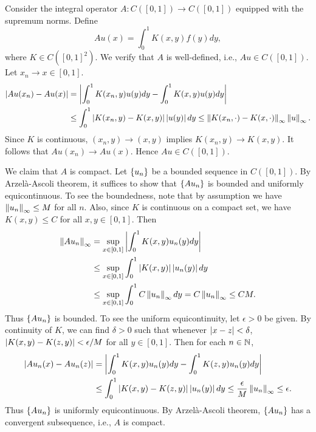 \begin{example}
    Consider the integral operator $A:C([0,1])\to C([0,1])$ equipped with the 
    supremum norms. Define 
    \begin{equation*}
        Au(x) = \int_0^1 K(x,y)f(y)dy,
    \end{equation*}
    where $K\in C([0,1]^2)$. We verify that $A$ is well-defined, i.e., 
    $Au\in C([0,1])$. Let $x_n\to x\in [0,1]$. 
    \begin{equation*}
        \begin{split}
            \left\lvert {Au(x_n) - Au(x)} \right\rvert &= \left\lvert {\int_0^1 K(x_n,y)u(y)dy - \int_0^1 K(x,y)u(y)dy} \right\rvert \\
            &\leq \int_0^1 \left\lvert {K(x_n,y) - K(x,y)} \right\rvert\left\lvert {u(y)} \right\rvert dy 
            \leq \left\lVert {K(x_n,\cdot) - K(x,\cdot)} \right\rVert_\infty\left\lVert {u} \right\rVert_\infty.
        \end{split}
    \end{equation*}
    Since $K$ is continuous, $(x_n,y)\to (x,y)$ implies $K(x_n,y)\to K(x,y)$. 
    It follows that $Au(x_n)\to Au(x)$. Hence $Au\in C([0,1])$.

    We claim that $A$ is compact. Let $\left\{ {u_n} \right\}$ be 
    a bounded sequence in $C([0,1])$. By Arzel\`a-Ascoli theorem, it suffices 
    to show that $\left\{ {Au_n} \right\}$ is bounded and uniformly equicontinuous. To see 
    the boundedness, note that by assumption we have $\left\lVert {u_n} \right\rVert_\infty\leq M$ 
    for all $n$. Also, since $K$ is continuous on a compact set, we have 
    $K(x,y)\leq C$ for all $x,y\in [0,1]$. Then 
    \begin{equation*}
        \begin{split}
            \left\lVert {Au_n} \right\rVert_\infty &= \sup_{x\in [0,1]}\left\lvert {\int_0^1 K(x,y)u_n(y)dy} \right\rvert \\
            &\leq \sup_{x\in [0,1]}\int_0^1 \left\lvert {K(x,y)} \right\rvert\left\lvert {u_n(y)} \right\rvert dy \\
            &\leq \sup_{x\in [0,1]}\int_0^1 C\left\lVert {u_n} \right\rVert_\infty dy = C\left\lVert {u_n} \right\rVert_\infty \leq CM.
        \end{split}
    \end{equation*} 
    Thus $\left\{ {Au_n} \right\}$ is bounded. To see the uniform equicontinuity, let 
    $\epsilon>0$ be given. By continuity of $K$, we can find $\delta>0$ such that 
    whenever $\left\lvert {x-z} \right\rvert<\delta$, $\left\lvert {K(x,y) - K(z,y)} \right\rvert<\epsilon/M$ for all $y\in [0,1]$. 
    Then for each $n\in\mathbb{N}$, 
    \begin{equation*}
        \begin{split}
            \left\lvert {Au_n(x) - Au_n(z)} \right\rvert &= \left\lvert {\int_0^1 K(x,y)u_n(y)dy - \int_0^1 K(z,y)u_n(y)dy} \right\rvert \\
            &\leq \int_0^1 \left\lvert {K(x,y) - K(z,y)} \right\rvert\left\lvert {u_n(y)} \right\rvert dy 
            \leq \frac{\epsilon}{M}\left\lVert {u_n} \right\rVert_\infty \leq \epsilon.
        \end{split}
    \end{equation*}
    Thus $\left\{ {Au_n} \right\}$ is uniformly equicontinuous. By Arzel\`a-Ascoli theorem, 
    $\left\{ {Au_n} \right\}$ has a convergent subsequence, i.e., $A$ is compact.
\end{example}

